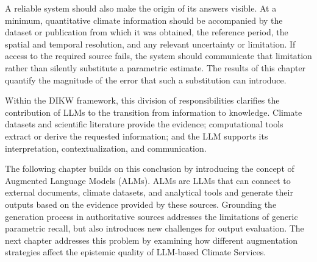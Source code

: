 A reliable system should also make the origin of its answers visible. At a minimum, quantitative climate information should be accompanied by the dataset or publication from which it was obtained, the reference period, the spatial and temporal resolution, and any relevant uncertainty or limitation. If access to the required source fails, the system should communicate that limitation rather than silently substitute a parametric estimate. The results of this chapter quantify the magnitude of the error that such a substitution can introduce.

Within the DIKW framework, this division of responsibilities clarifies the contribution of LLMs to the transition from information to knowledge. Climate datasets and scientific literature provide the evidence; computational tools extract or derive the requested information; and the LLM supports its interpretation, contextualization, and communication. 

The following chapter builds on this conclusion by introducing the concept of Augmented Language Models (ALMs). ALMs are LLMs that can connect to external documents, climate datasets, and analytical tools and generate their outputs based on the evidence provided by these sources. Grounding the generation process in authoritative sources addresses the limitations of generic parametric recall, but also introduces new challenges for output evaluation. The next chapter addresses this problem by examining how different augmentation strategies affect the epistemic quality of LLM-based Climate Services.